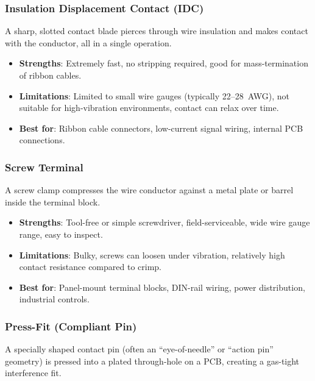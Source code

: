 \documentclass[11pt,letterpaper,twoside,openany]{book}
\begin{document}
\subsubsection{Insulation Displacement Contact (IDC)}

A sharp, slotted contact blade pierces through wire insulation and makes contact with the conductor, all in a single operation.

\begin{itemize}[nosep,leftmargin=1.5em]
  \item \textbf{Strengths}: Extremely fast, no stripping required, good for mass-termination of ribbon cables.
  \item \textbf{Limitations}: Limited to small wire gauges (typically 22--28~AWG), not suitable for high-vibration environments, contact can relax over time.
  \item \textbf{Best for}: Ribbon cable connectors, low-current signal wiring, internal PCB connections.
\end{itemize}

\subsubsection{Screw Terminal}

A screw clamp compresses the wire conductor against a metal plate or barrel inside the terminal block.

\begin{itemize}[nosep,leftmargin=1.5em]
  \item \textbf{Strengths}: Tool-free or simple screwdriver, field-serviceable, wide wire gauge range, easy to inspect.
  \item \textbf{Limitations}: Bulky, screws can loosen under vibration, relatively high contact resistance compared to crimp.
  \item \textbf{Best for}: Panel-mount terminal blocks, DIN-rail wiring, power distribution, industrial controls.
\end{itemize}

\subsubsection{Press-Fit (Compliant Pin)}

A specially shaped contact pin (often an ``eye-of-needle'' or ``action pin'' geometry) is pressed into a plated through-hole on a PCB, creating a gas-tight interference fit.
\end{document}
